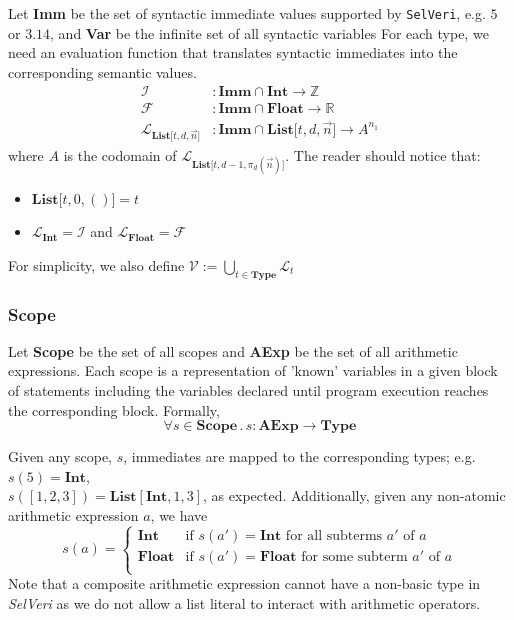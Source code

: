 \documentclass{article}
\begin{document}
Let \textbf{Imm} be the set of syntactic immediate values supported by \texttt{SelVeri}, e.g. $5$ or  $3.14$, and \textbf{Var} be the infinite set of all syntactic variables  For each type, we need an evaluation function that translates syntactic immediates into the corresponding semantic values.
\begin{align*}
\mathcal{I}&: \textbf{Imm} \cap \textbf{Int} \rightarrow \mathbb{Z} \\
\mathcal{F}&: \textbf{Imm} \cap \textbf{Float} \rightarrow \mathbb{R} \\
\mathcal{L}_{\textbf{List[$t, d, \vec{n}$]}}&: \textbf{Imm} \cap \textbf{List[$t, d, \vec{n}$]} \rightarrow A^{n_1} 
\end{align*}
where $A$ is the codomain of $\mathcal{L}_{\textbf{List[$t, d-1, \pi_d(\vec{n})$]}}$. The reader should notice that:
\begin{itemize}
    \item $\textbf{List[$t, 0, ()$]} = t$ 
    \item $\mathcal{L}_\textbf{Int} = \mathcal{I}$ and $\mathcal{L}_\textbf{Float} = \mathcal{F}$
\end{itemize}
For simplicity, we also define $\mathcal{V} := \bigcup_{t \in \textbf{Type}} \mathcal{L}_t$

\subsubsection{Scope}

Let \textbf{Scope} be the set of all scopes and \textbf{AExp} be the set of all arithmetic expressions. Each scope is a representation  of 'known' variables in a given block of statements including the variables declared until program execution reaches the corresponding block. Formally,
\[
\forall s \in \textbf{Scope} \, . \, s: \textbf{AExp}  \rightarrow \textbf{Type}
\]

Given any scope, $s$, immediates are mapped to the corresponding types; e.g. $s(5) = \textbf{Int}$,\\ $s([1,2,3]) = \textbf{List}[\textbf{Int}, 1, 3]$, as expected. Additionally, given any non-atomic arithmetic expression $a$, we have
\[
s(a) = \begin{cases}
\textbf{Int} & \text{if $s(a') = \textbf{Int}$ for all subterms $a'$ of $a$} \\
\textbf{Float} & \text{if $s(a') = \textbf{Float}$ for some subterm $a'$ of $a$} \\ 
\end{cases}
\] 
Note that a composite arithmetic expression cannot have a non-basic type in \textit{SelVeri} as
we do not allow a list literal to interact with arithmetic operators.
\end{document}
